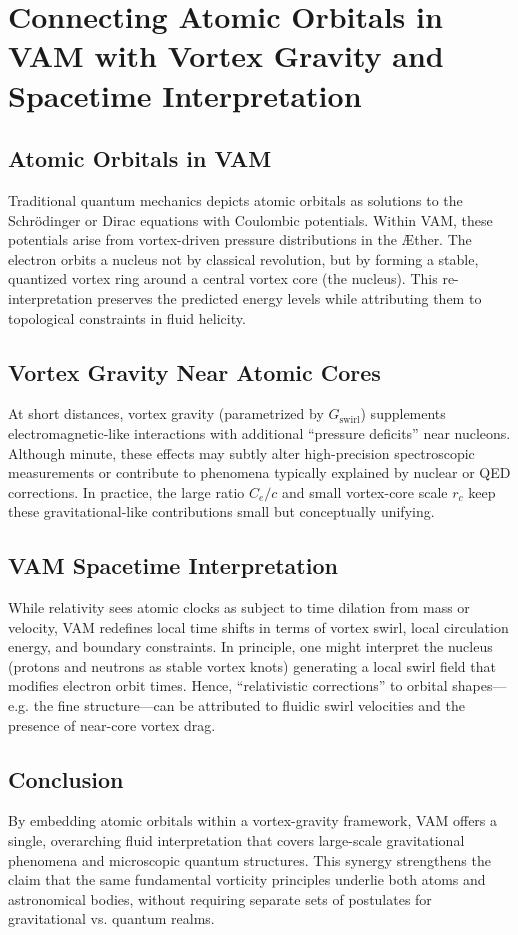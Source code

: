 \documentclass[aps,preprint,superscriptaddress]{revtex4-2}
\begin{document}
    \section{Connecting Atomic Orbitals in VAM with Vortex Gravity and Spacetime Interpretation}

    \subsection{Atomic Orbitals in VAM}
    Traditional quantum mechanics depicts atomic orbitals as solutions to the Schrödinger or Dirac equations with Coulombic potentials. Within VAM, these potentials arise from vortex-driven pressure distributions in the Æther. The electron orbits a nucleus not by classical revolution, but by forming a stable, quantized vortex ring around a central vortex core (the nucleus). This re-interpretation preserves the predicted energy levels while attributing them to topological constraints in fluid helicity.

    \subsection{Vortex Gravity Near Atomic Cores}
    At short distances, vortex gravity (parametrized by \(G_{\text{swirl}}\)) supplements electromagnetic-like interactions with additional “pressure deficits” near nucleons. Although minute, these effects may subtly alter high-precision spectroscopic measurements or contribute to phenomena typically explained by nuclear or QED corrections. In practice, the large ratio \(C_e/c\) and small vortex-core scale \(r_c\) keep these gravitational-like contributions small but conceptually unifying.

    \subsection{VAM Spacetime Interpretation}
    While relativity sees atomic clocks as subject to time dilation from mass or velocity, VAM redefines local time shifts in terms of vortex swirl, local circulation energy, and boundary constraints. In principle, one might interpret the nucleus (protons and neutrons as stable vortex knots) generating a local swirl field that modifies electron orbit times. Hence, “relativistic corrections” to orbital shapes—e.g. the fine structure—can be attributed to fluidic swirl velocities and the presence of near-core vortex drag.

    \subsection{Conclusion}
    By embedding atomic orbitals within a vortex-gravity framework, VAM offers a single, overarching fluid interpretation that covers large-scale gravitational phenomena and microscopic quantum structures. This synergy strengthens the claim that the same fundamental vorticity principles underlie both atoms and astronomical bodies, without requiring separate sets of postulates for gravitational vs. quantum realms.
\end{document}
